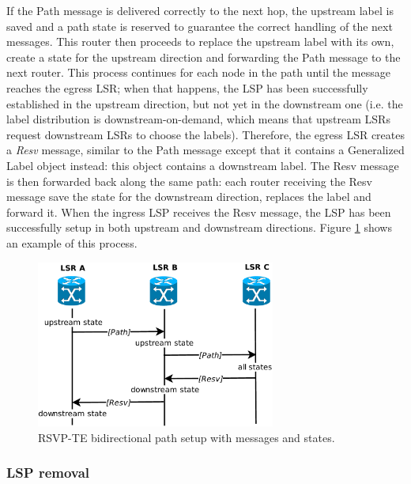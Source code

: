 \documentclass[10pt,a4paper]{report}
\begin{document}
If the Path message is delivered correctly to the next hop, the
upstream label is saved and a path state is reserved to guarantee the
correct handling of the next messages. This router then proceeds to
replace the upstream label with its own, create a state for the
upstream direction and forwarding the Path message to the next
router. This process continues for each node in the path until the
message reaches the egress LSR; when that happens, the LSP has been
successfully established in the upstream direction, but not yet in the
downstream one (i.e. the label distribution is downstream-on-demand,
which means that upstream LSRs request downstream LSRs to choose the
labels). Therefore, the egress LSR creates a \textit{Resv} message,
similar to the Path message except that it contains a Generalized
Label object instead: this object contains a downstream label. The
Resv message is then forwarded back along the same path: each router
receiving the Resv message save the state for the downstream
direction, replaces the label and forward it. When the ingress LSP
receives the Resv message, the LSP has been successfully setup in both
upstream and downstream directions. Figure \ref{fig:rsvp_path} shows
an example of this process.

\begin{figure}[!htbp]
  \centering
  \includegraphics[width=0.7\textwidth]{img/rsvp_path}
  \caption[RSVP-TE path setup]{RSVP-TE bidirectional path setup with
    messages and states.}
  \label{fig:rsvp_path}
\end{figure}

\subsubsection{LSP removal}
\end{document}
